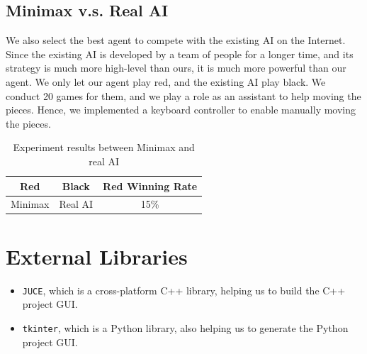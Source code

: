 \documentclass[letterpaper]{article}
\begin{document}
\subsection{Minimax v.s. Real AI}
\label{subsec:minimax-v.s.-real-ai}
We also select the best agent to compete with the existing AI on the Internet.
Since the existing AI is developed by a team of people for a longer time, and its strategy is much more high-level than ours, it is much more powerful than our agent.
We only let our agent play red, and the existing AI play black.
We conduct 20 games for them, and we play a role as an assistant to help moving the pieces.
Hence, we implemented a keyboard controller to enable manually moving the pieces.
\begin{table}[htbp]
    \centering
    \caption{Experiment results between Minimax and real AI}
    \label{tab:tab3}
    \begin{tabular}{|c|c|c|}
        \hline
        Red & Black & Red Winning Rate  \\ \hline
        Minimax & Real AI & 15\% \\ \hline
    \end{tabular}
\end{table}


\section{External Libraries}\label{sec:acknowledgements}

\begin{itemize}
    \item \texttt{JUCE}, which is a cross-platform C++ library, helping us to build the C++ project GUI\@.
    \item \texttt{tkinter}, which is a Python library, also helping us to generate the Python project GUI\@.
\end{itemize}



\end{document}
